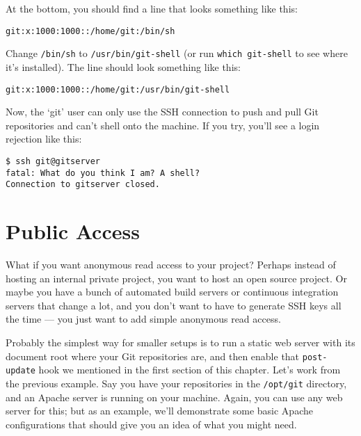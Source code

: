 \documentclass[a4paper]{book}
\begin{document}
At the bottom, you should find a line that looks something like this:

\begin{shaded}\begin{verbatim}
git:x:1000:1000::/home/git:/bin/sh
\end{verbatim}\end{shaded}

Change \texttt{/bin/sh} to \texttt{/usr/bin/git-shell} (or run \texttt{which git-shell} to see where it's installed). The line should look something like this:

\begin{shaded}\begin{verbatim}
git:x:1000:1000::/home/git:/usr/bin/git-shell
\end{verbatim}\end{shaded}

Now, the `git' user can only use the SSH connection to push and pull Git repositories and can't shell onto the machine. If you try, you'll see a login rejection like this:

\begin{shaded}\begin{verbatim}
$ ssh git@gitserver
fatal: What do you think I am? A shell?
Connection to gitserver closed.
\end{verbatim}\end{shaded}

\section{Public Access}

What if you want anonymous read access to your project? Perhaps instead of hosting an internal private project, you want to host an open source project. Or maybe you have a bunch of automated build servers or continuous integration servers that change a lot, and you don't want to have to generate SSH keys all the time --- you just want to add simple anonymous read access.

Probably the simplest way for smaller setups is to run a static web server with its document root where your Git repositories are, and then enable that \texttt{post-update} hook we mentioned in the first section of this chapter. Let's work from the previous example. Say you have your repositories in the \texttt{/opt/git} directory, and an Apache server is running on your machine. Again, you can use any web server for this; but as an example, we'll demonstrate some basic Apache configurations that should give you an idea of what you might need.
\end{document}

